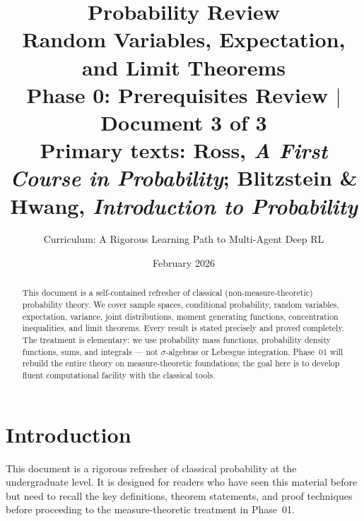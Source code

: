 \documentclass[11pt,a4paper]{article}
\title{\textbf{Probability Review}\\[10pt]
\large Random Variables, Expectation, and Limit Theorems\\[5pt]
\normalsize Phase 0: Prerequisites Review $\mid$ Document 3 of 3\\
\normalsize Primary texts: Ross, \emph{A First Course in Probability}; Blitzstein \& Hwang, \emph{Introduction to Probability}}
\author{Curriculum: A Rigorous Learning Path to Multi-Agent Deep RL}
\date{February 2026}
\theoremstyle{definition}
\theoremstyle{plain}
\theoremstyle{remark}
\begin{document}
\maketitle

\begin{abstract}
This document is a self-contained refresher of classical (non-measure-theoretic) probability
theory. We cover sample spaces, conditional probability, random variables, expectation,
variance, joint distributions, moment generating functions, concentration inequalities, and
limit theorems. Every result is stated precisely and proved completely. The treatment is
elementary: we use probability mass functions, probability density functions, sums, and
integrals --- not $\sigma$-algebras or Lebesgue integration. Phase~01 will rebuild the entire
theory on measure-theoretic foundations; the goal here is to develop fluent computational
facility with the classical tools.
\end{abstract}

\tableofcontents
\newpage

\section{Introduction}
\label{sec:intro}

This document is a rigorous refresher of classical probability at the undergraduate level.
It is designed for readers who have seen this material before but need to recall the key
definitions, theorem statements, and proof techniques before proceeding to the
measure-theoretic treatment in Phase~01.
\end{document}
